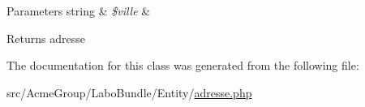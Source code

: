 \begin{DoxyParams}[1]{Parameters}
string & {\em \$ville} & \\
\hline
\end{DoxyParams}
\begin{DoxyReturn}{Returns}
adresse 
\end{DoxyReturn}


The documentation for this class was generated from the following file\+:\begin{DoxyCompactItemize}
\item 
src/\+Acme\+Group/\+Labo\+Bundle/\+Entity/\hyperlink{adresse_8php}{adresse.\+php}\end{DoxyCompactItemize}
